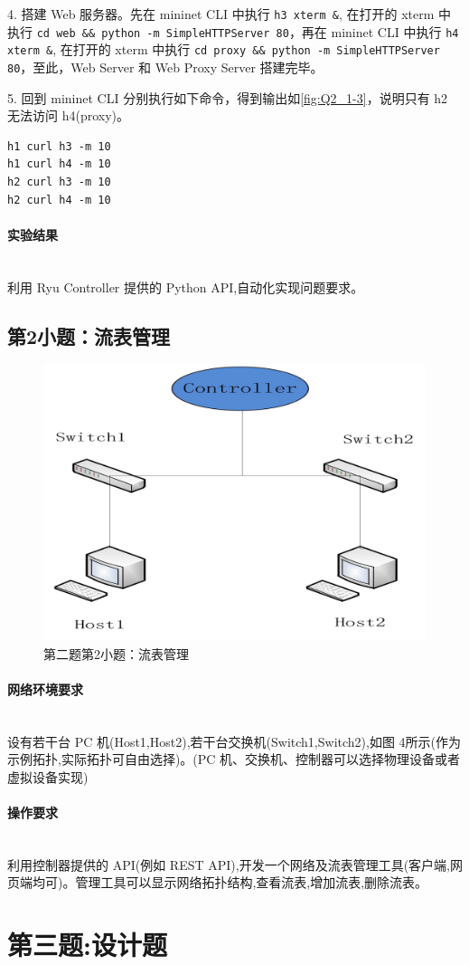 \documentclass[format=draft,language=chinese,category=SDN]{hustreport}
\newcommand{\myparagraph}[1]{\paragraph{#1}\mbox{}\\}
\newcommand{\code}{\texttt}
\begin{document}
4. 搭建 Web 服务器。先在 mininet CLI 中执行 \code{h3 xterm \&}, 在打开的 xterm 中执行 \code{cd web \&\& python -m SimpleHTTPServer 80}，再在 mininet CLI 中执行 \code{h4 xterm \&}, 在打开的 xterm 中执行 \code{cd proxy \&\& python -m SimpleHTTPServer 80}，至此，Web Server 和 Web Proxy Server 搭建完毕。

5. 回到 mininet CLI 分别执行如下命令，得到输出如\autoref{fig:Q2_1-3}，说明只有 h2 无法访问 h4(proxy)。

\begin{lstlisting}
h1 curl h3 -m 10
h1 curl h4 -m 10
h2 curl h3 -m 10
h2 curl h4 -m 10
\end{lstlisting}

\myparagraph{实验结果}

利用 Ryu Controller 提供的 Python API,自动化实现问题要求。

\subsection{第2小题：流表管理}\label{sec:Q2_2}

\begin{figure}[!h]
\centering
\includegraphics[width=.618\textwidth]{fig/2_2-0.png}
\caption{第二题第2小题：流表管理}\label{fig:Q2_2-0}
\end{figure}

\myparagraph{网络环境要求}

设有若干台 PC 机(Host1,Host2),若干台交换机(Switch1,Switch2),如图 4所示(作为示例拓扑,实际拓扑可自由选择)。(PC 机、交换机、控制器可以选择物理设备或者虚拟设备实现)

\myparagraph{操作要求}

利用控制器提供的 API(例如 REST API),开发一个网络及流表管理工具(客户端,网页端均可)。管理工具可以显示网络拓扑结构,查看流表,增加流表,删除流表。


\section{第三题:设计题}\label{sec:Q3}
\end{document}

